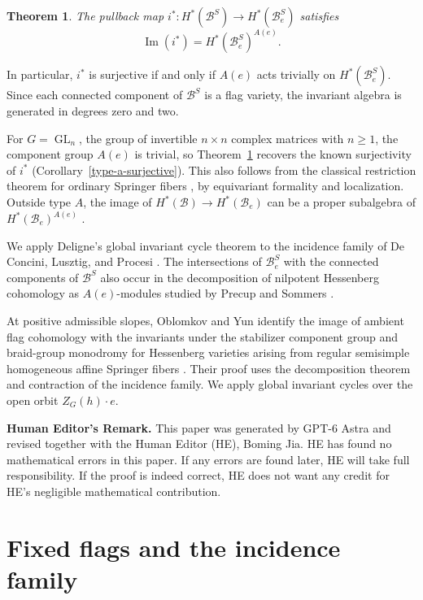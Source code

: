 \documentclass[12pt]{article}
\theoremstyle{paperplain}
\newtheorem{theorem}{Theorem}[section]
\DeclareMathOperator{\im}{Im}
\DeclareMathOperator{\GL}{GL}
\newcommand{\B}{\mathcal B}
\begin{document}
\begin{theorem}\label{main}
    The pullback map $i^*\colon H^*(\B^S)\to H^*(\B_e^S)$ satisfies
    \[
        \im(i^*)
        =H^*(\B_e^S)^{A(e)}.
    \]
\end{theorem}

In particular, $i^*$ is surjective if and only if $A(e)$ acts trivially on $H^*(\B_e^S)$. Since each connected component of $\B^S$ is a flag variety, the invariant algebra is generated in degrees zero and two.

For $G=\GL_n$, the group of invertible $n\times n$ complex matrices with $n\ge1$, the component group $A(e)$ is trivial, so Theorem~\ref{main} recovers the known surjectivity of $i^*$ (Corollary~\ref{type-a-surjective}). This also follows from the classical restriction theorem for ordinary Springer fibers \cite{DCP,Tanisaki}, by equivariant formality and localization. Outside type $A$, the image of $H^*(\B)\to H^*(\B_e)$ can be a proper subalgebra of $H^*(\B_e)^{A(e)}$ \cite[Warning~10.19]{HKM}.

We apply Deligne's global invariant cycle theorem \cite{Deligne} to the incidence family of De Concini, Lusztig, and Procesi \cite[Sections~2.1--2.4 and~3.7]{DLP}. The intersections of $\B_e^S$ with the connected components of $\B^S$ also occur in the decomposition of nilpotent Hessenberg cohomology as $A(e)$-modules studied by Precup and Sommers \cite[Section~3.2 and Corollary~3.6]{PS}.

At positive admissible slopes, Oblomkov and Yun identify the image of ambient flag cohomology with the invariants under the stabilizer component group and braid-group monodromy for Hessenberg varieties arising from regular semisimple homogeneous affine Springer fibers \cite[Theorem~5.5.1(1)]{OY}. Their proof uses the decomposition theorem and contraction of the incidence family. We apply global invariant cycles over the open orbit $Z_G(h)\cdot e$.

\medskip
\noindent\textbf{Human Editor's Remark.}
This paper was generated by GPT-6 Astra and revised together with the Human Editor (HE), Boming Jia.
HE has found no mathematical errors in this paper.
If any errors are found later, HE will take full responsibility.
If the proof is indeed correct, HE does not want any credit for HE's negligible mathematical contribution.

\vspace{2em}
\section{Fixed flags and the incidence family}
\label{section-centralizers}
\label{section-incidence}
\end{document}
